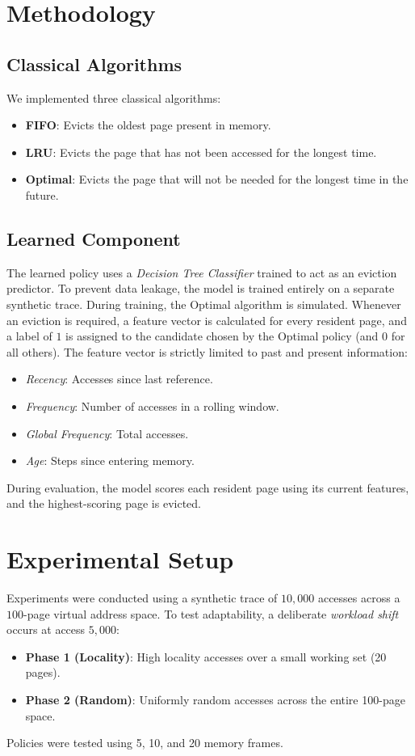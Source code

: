 \documentclass[10pt,twocolumn,letterpaper]{article}
\begin{document}
\section{Methodology}

\subsection{Classical Algorithms}
We implemented three classical algorithms:
\begin{itemize}
    \item \textbf{FIFO}: Evicts the oldest page present in memory.
    \item \textbf{LRU}: Evicts the page that has not been accessed for the longest time.
    \item \textbf{Optimal}: Evicts the page that will not be needed for the longest time in the future.
\end{itemize}

\subsection{Learned Component}
The learned policy uses a \textit{Decision Tree Classifier} trained to act as an eviction predictor. To prevent data leakage, the model is trained entirely on a separate synthetic trace. 
During training, the Optimal algorithm is simulated. Whenever an eviction is required, a feature vector is calculated for every resident page, and a label of $1$ is assigned to the candidate chosen by the Optimal policy (and $0$ for all others). 
The feature vector is strictly limited to past and present information:
\begin{itemize}
    \item \textit{Recency}: Accesses since last reference.
    \item \textit{Frequency}: Number of accesses in a rolling window.
    \item \textit{Global Frequency}: Total accesses.
    \item \textit{Age}: Steps since entering memory.
\end{itemize}
During evaluation, the model scores each resident page using its current features, and the highest-scoring page is evicted.

\section{Experimental Setup}
Experiments were conducted using a synthetic trace of $10,000$ accesses across a $100$-page virtual address space. To test adaptability, a deliberate \textit{workload shift} occurs at access $5,000$:
\begin{itemize}
    \item \textbf{Phase 1 (Locality)}: High locality accesses over a small working set (20 pages).
    \item \textbf{Phase 2 (Random)}: Uniformly random accesses across the entire 100-page space.
\end{itemize}
Policies were tested using 5, 10, and 20 memory frames.
\end{document}
